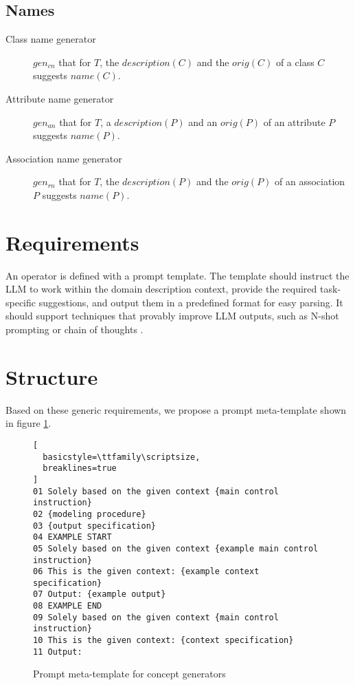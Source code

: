 \subsection{Names}

\begin{description}
\item [Class name generator] $gen_{cn}$ that for $T$, the $description(C)$ and the $orig(C)$ of a class $C$ suggests  $name(C)$.

\item [Attribute name generator] $gen_{an}$ that for $T$,  a $description(P)$ and an $orig(P)$ of an attribute $P$ suggests $name(P)$.

\item [Association name generator] $gen_{rn}$ that for $T$, the $description(P)$ and the $orig(P)$ of an association $P$ suggests $name(P)$.
\end{description}


\section{Requirements}

An operator is defined with a prompt template. The template should instruct the LLM to work within the domain description context, provide the required task-specific suggestions, and output them in a predefined format for easy parsing. It should support techniques that provably improve LLM outputs, such as N-shot prompting \cite{Brown2020} or chain of thoughts \cite{Wei2022}.


\section{Structure}

Based on these generic requirements, we propose a prompt meta-template shown in figure \ref{fig:meta-templates}.

\begin{figure}[!h]
    \centering
\begin{lstlisting}[
  basicstyle=\ttfamily\scriptsize,
  breaklines=true
]
01 Solely based on the given context {main control instruction}
02 {modeling procedure}
03 {output specification}
04 EXAMPLE START
05 Solely based on the given context {example main control instruction}
06 This is the given context: {example context specification}
07 Output: {example output}
08 EXAMPLE END
09 Solely based on the given context {main control instruction}
10 This is the given context: {context specification}
11 Output:
\end{lstlisting}
    \caption{\centering Prompt meta-template for concept generators}
    \label{fig:meta-templates}
\end{figure}

